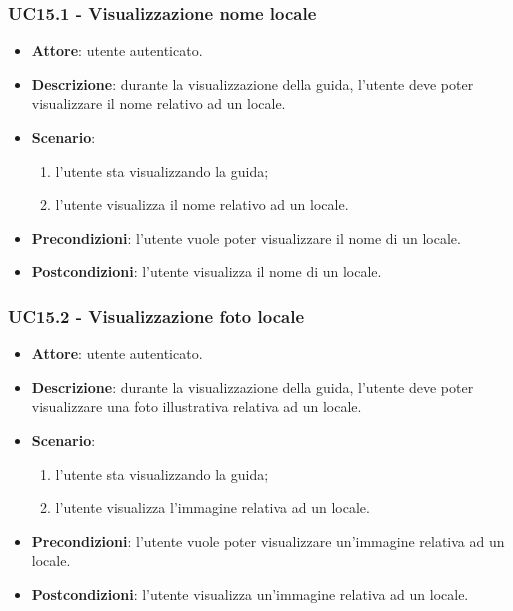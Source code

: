 \subsubsection{UC15.1 - Visualizzazione nome locale}
\begin{itemize}
    \item \textbf{Attore}: utente autenticato.
    \item \textbf{Descrizione}: durante la visualizzazione della guida, l'utente deve poter visualizzare il nome relativo ad un locale.
    \item \textbf{Scenario}:
    \begin{enumerate}
        \item l'utente sta visualizzando la guida;
        \item l'utente visualizza il nome relativo ad un locale.
    \end{enumerate}
    \item \textbf{Precondizioni}: l'utente vuole poter visualizzare il nome di un locale.
    \item \textbf{Postcondizioni}: l'utente visualizza il nome di un locale.
\end{itemize}

\subsubsection{UC15.2 - Visualizzazione foto locale}
\begin{itemize}
    \item \textbf{Attore}: utente autenticato.
    \item \textbf{Descrizione}: durante la visualizzazione della guida, l'utente deve poter visualizzare una foto illustrativa relativa ad un locale.
    \item \textbf{Scenario}:
    \begin{enumerate}
        \item l'utente sta visualizzando la guida;
        \item l'utente visualizza l'immagine relativa ad un locale.
    \end{enumerate}
    \item \textbf{Precondizioni}: l'utente vuole poter visualizzare un'immagine relativa ad un locale.
    \item \textbf{Postcondizioni}: l'utente visualizza un'immagine relativa ad un locale.
\end{itemize}

